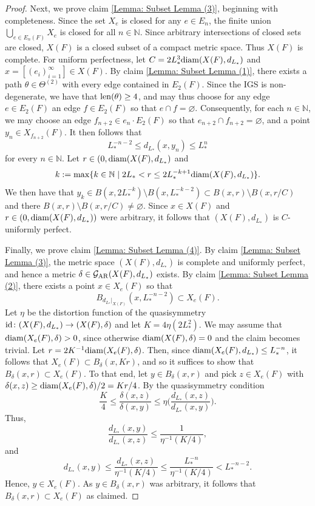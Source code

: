 \documentclass{amsart}
\newcommand{\diam}{{\rm diam}}
\newcommand{\len}{{\rm len}}
\newcommand{\id}{{\rm id}}
\newcommand{\AR}{{\rm AR}}
\numberwithin{equation}{section}
\theoremstyle{definition}
\theoremstyle{remark}
\newcommand{\N}{\mathbb{N}}
\newcommand{\cG}{\mathcal{G}}
\begin{document}
\begin{proof}
    Next, we prove claim \eqref{Lemma: Subset Lemma (3)}, beginning with completeness. Since the set \(X_e\) is closed for any \(e\in E_n\), the finite union \(\bigcup_{e\in E_n(F)}X_e\) is closed for all \(n\in\N\). Since arbitrary intersections of closed sets are closed, \(X(F)\) is a closed subset of a compact metric space. Thus \(X(F)\) is complete. For uniform perfectness, let \(C=2L_*^3\diam(X(F),d_{L_*})\) and \(x=[(e_i)_{i=1}^\infty]\in X(F)\). By claim \eqref{Lemma: Subset Lemma (1)}, there exists a path \(\theta\in \Theta^{(2)}\) with every edge contained in \(E_2(F)\). Since the IGS is non-degenerate, we have that \(\len(\theta)\geq 4\), and may thus choose for any edge \(e\in E_2(F)\) an edge \(f\in E_2(F)\) so that \(e\cap f=\varnothing\). Consequently, for each \(n\in\N\), we may choose an edge \(f_{n+2}\in e_n\cdot E_2(F)\) so that \(e_{n+2}\cap f_{n+2}=\varnothing\), and a point \(y_n\in X_{f_{n+2}}(F)\). It then follows that
        \[
            L_*^{-n-2}\leq d_{L_*}(x,y_n)\leq L_*^n
        \]
    for every \(n\in \N\). Let \(r\in (0,\diam(X(F),d_{L_*})\) and 
        \[
            k:=\max\{k\in\N\mid 2L_*<r\leq 2L_*^{-k+1}\diam(X(F),d_{L_*})\}.
        \]
    We then have that \(y_k\in B(x,2L_*^{-k})\setminus B(x,L_*^{-k-2})\subset B(x,r)\setminus B(x,r/C)\) and there \(B(x,r)\setminus B(x,r/C)\neq \varnothing\). Since \(x\in X(F)\) and \(r\in (0,\diam(X(F),d_{L_*}))\) were arbitrary, it follows that \((X(F),d_{L_*})\) is \(C\)-uniformly perfect.
    \vspace{5pt}

    Finally, we prove claim \eqref{Lemma: Subset Lemma (4)}. By claim \eqref{Lemma: Subset Lemma (3)}, the metric space \((X(F),d_{L_*})\) is complete and uniformly perfect, and hence a metric \(\delta\in\cG_\AR(X(F),d_{L_*})\) exists. By claim \eqref{Lemma: Subset Lemma (2)}, there exists a point \(x\in X_e(F)\) so that
        \[
            B_{d_{L_*}\vert_{X(F)}}(x,L_*^{-n-2})\subset X_e(F).
        \]
    Let \(\eta\) be the distortion function of the quasisymmetry \(\id\colon (X(F),d_{L_*})\to (X(F),\delta)\) and let \(K=4\eta(2L_*^2)\). We may assume that \(\diam(X_e(F),\delta)>0\), since otherwise \(\diam(X(F),\delta)=0\) and the claim becomes trivial. Let \(r=2K^{-1}\diam(X_e(F),\delta)\). Then, since \(\diam(X_e(F),d_{L_*})\leq L_*^{-n}\), it follows that \(X_e(F)\subset B_\delta(x,Kr)\), and so it suffices to show that \(B_\delta(x,r)\subset X_e(F)\). To that end, let \(y\in B_\delta(x,r)\) and pick \(z\in X_e(F)\) with \(\delta(x,z)\geq\diam(X_e(F),\delta)/2=Kr/4\). By the quasisymmetry condition
        \[
            \frac{K}{4}\leq\frac{\delta(x,z)}{\delta(x,y)}\leq \eta\bigg(\frac{d_{L_*}(x,z)}{d_{L_*}(x,y)}\bigg).
        \]
    Thus,
        \[
            \frac{d_{L_*}(x,y)}{d_{L_*}(x,z)}\leq\frac{1}{\eta^{-1}(K/4)},
        \]
    and
        \[
            d_{L_*}(x,y)\leq\frac{d_{L_*}(x,z)}{\eta^{-1}(K/4)}\leq\frac{L_*^{-n}}{\eta^{-1}(K/4)}<L_*^{-n-2}.
        \]
    Hence, \(y\in X_e(F)\). As \(y\in B_\delta(x,r)\) was arbitrary, it follows that  \(B_\delta(x,r)\subset X_e(F)\) as claimed.
\end{proof}
\end{document}
